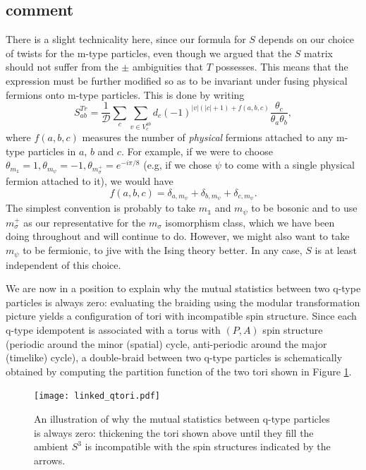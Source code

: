\documentclass[12pt,a4paper]{article}
\newcounter{arrow}
\newcommand{\unit}{\mathds{1}}
\newcommand{\mcd}{\mathcal{D}}
\newcommand\be            {\begin{equation}}
\newcommand\ee            {\end{equation}}
\begin{document}
 
 


 
\subsection{comment}
There is a slight technicality here, since our formula for $S$ depends on our choice of twists for the m-type particles, even though we argued that the $S$ matrix should not suffer from the $\pm$ ambiguities that $T$ possesses. This means that the expression must be further modified so as to be invariant under fusing physical fermions onto m-type particles. This is done by writing 
\be S^{Tr}_{ab} = \frac{1}{\mcd} \sum_c \sum_{v \in V^{ab}_c} d_c (-1)^{|v| (|c| + 1) + f(a,b,c)}   \frac{\theta_c}{\theta_a\theta_b},\ee
where $f(a,b,c)$ measures the number of {\it physical} fermions attached to any m-type particles in $a$, $b$ and $c$. For example, if we were to choose $\theta_{m_\unit} = 1, \theta_{m_\psi} = -1,\theta_{m^+_\sigma} = e^{-i\pi/8}$ (e.g, if we chose $\psi$ to come with a single physical fermion attached to it), we would have 
\be {f(a,b,c)} = \delta_{a,m_\psi} + \delta_{b,m_\psi} + \delta_{c,m_\psi}.\ee
The simplest convention is probably to take $m_\unit$ and $m_\psi$ to be bosonic and to use $m_\sigma^+$ as our representative for the $m_\sigma$ isomorphism class, which we have been doing throughout and will continue to do. However, we might also want to take $m_\psi$ to be fermionic, to jive with the Ising theory better. In any case, $S$ is at least independent of this choice. 

We are now in a position to explain why the mutual statistics between two q-type particles is always zero: evaluating the braiding using the modular transformation picture yields a configuration of tori with incompatible spin structure. Since each q-type idempotent is associated with a torus with $(P,A)$ spin structure (periodic around the minor (spatial) cycle, anti-periodic around the major (timelike) cycle), a double-braid between two q-type particles is schematically obtained by computing the partition function of the two tori shown in Figure \ref{linked_tori}. 
\begin{figure} 
\centering
\texttt{[image: linked\_qtori.pdf]}
\caption{\label{linked_tori} An illustration of why the mutual statistics between q-type particles is always zero: thickening the tori shown above until they fill the ambient $S^3$ is incompatible with the spin structures indicated by the arrows.}
\end{figure}
\end{document}
